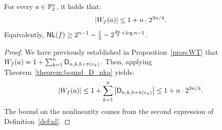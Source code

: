 \documentclass[11pt]{llncs}
\begin{document}
\begin{Corollary}\label{cor:bound_walsh_cauchy}
    For every $a\in\mathbb{F}_2^n$, it holds that:
    \[
        |W_{f}(a)|\leq 1+n\cdot 2^{3n/4}.
    \]
Equivalently, 
$\mathsf{NL}(f)\ge 2^{n-1} - \frac{1}{2} -2^{\frac{3n}{4} + \log n -1}$.
\end{Corollary}

\begin{proof}
    We have previously established in Proposition~\ref{prop:WT} that $W_{f}(a)=1+\sum_{k=1}^n\mathsf{D}_{n,k,b+\pi(e_k)}$. Then, applying Theorem~\ref{theorem:bound_D_nka} yields:
    \[
        |\wt{f}(a)|\leq 1+\sum_{k=1}^n\left|\Dnka{n}{k}{b+\pi(e_k)}\right|\leq 1+ n\cdot 2^{3n/4}.%
    \]
The bound on the nonlinearity comes from the second expression of Definition~\ref{def:nl}.
\end{proof}
\end{document}
